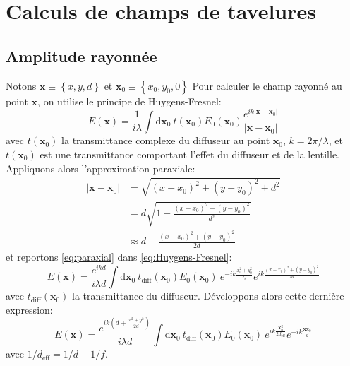 \chapter{Calculs de champs de tavelures}
\section{Amplitude rayonnée}
Notons $\mathbf{x} \equiv \left\lbrace x,y,d \right\rbrace$ et $\mathbf{x}_0 \equiv \left\lbrace x_0,y_0,0 \right\rbrace$
Pour calculer le champ rayonné au point $\mathbf{x}$, on utilise le principe de Huygens-Fresnel:
\begin{equation}
E(\mathbf{x})=\frac{1}{i \lambda} \int {\mathrm{d}\mathbf{x}_0 \: t(\mathbf{x}_0) E_0(\mathbf{x}_0) \frac{e^{ik \left| \mathbf{x}-\mathbf{x}_0 \right| }}{\left| \mathbf{x} - \mathbf{x}_0 \right| }}
\label{eq:Huygens-Fresnel}
\end{equation}
avec $t(\mathbf{x}_0)$ la transmittance complexe du diffuseur au point $\mathbf{x}_0$, $k=2\pi /\lambda$, et $t(\mathbf{x}_0)$ est une transmittance comportant l'effet du diffuseur et de la lentille.
Appliquons alors l'approximation paraxiale:
\begin{align}
\nonumber \left| \mathbf{x} - \mathbf{x}_0 \right| &= \sqrt{(x-x_0)^2+(y-y_0)^2+d^2} \\
\nonumber & = d \sqrt{1+\frac{(x-x_0)^2+(y-y_0)^2}{d^2}} \\
& \approx d+ \frac{(x-x_0)^2+(y-y_0)^2}{2d}
\label{eq:paraxial}
\end{align}
et reportons \ref{eq:paraxial} dans \ref{eq:Huygens-Fresnel}:
\begin{equation}
E(\mathbf{x})=\frac{e^{ikd}}{i \lambda d} \int{\mathrm{d} \mathbf{x}_0 \: t_{\mathrm{diff}}(\mathbf{x}_0) E_0(\mathbf{x}_0) \: e^{-ik \frac{x_0^2+y_0^2}{2f}} e^{ik \frac{(x-x_0)^2+(y-y_0)^2}{2d}}}
\end{equation}
avec $t_{\mathrm{diff}}(\mathbf{x}_0)$ la transmittance du diffuseur. Développons alors cette dernière expression:
\begin{equation}
E(\mathbf{x})=\frac{e^{i k \left( d + \frac{x^2 + y^2}{2 d}\right) }}{i \lambda d} \int{\mathrm{d} \mathbf{x}_0 \: t_{\mathrm{diff}}(\mathbf{x}_0) E_0(\mathbf{x}_0) \: e^{ik \frac{\mathbf{x}_0^2}{2 d_{\mathrm{eff}}}} e^{-ik\frac{\mathbf{x} \mathbf{x}_0}{d}}}
\end{equation}
avec $1/d_{\mathrm{eff}}=1/d-1/f$.

